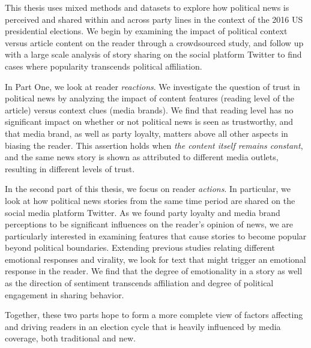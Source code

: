 \def\abstractpage{\cleardoublepage
\begin{center}{\large{\bf \@title} \\
by \\
\@author \\[\baselineskip]}
\par
\def\baselinestretch{1}\@normalsize
Submitted to the \@department, \\
\@school \\
on \@thesisdate, in partial fulfillment of the \\
requirements for the \@degreeword\ of \\
\@degree
\end{center}
\par
\begin{abstract}}
This thesis uses mixed methods and datasets to explore how political news is perceived and shared within and across party lines in the context of the 2016 US presidential elections. We begin by examining the impact of political context versus article content on the reader through a crowdsourced study, and follow up with a large scale analysis of story sharing on the social platform Twitter to find cases where popularity transcends political affiliation.
 
In Part One, we look at reader \emph{reactions}. We investigate the question of trust in political news by analyzing the impact of content features (reading level of the article) versus context clues (media brands). We find that reading level has no significant impact on whether or not political news is seen as trustworthy, and that media brand, as well as party loyalty, matters above all other aspects in biasing the reader. This assertion holds when \emph{the content itself remains constant}, and the same news story is shown as attributed to different media outlets, resulting in different levels of trust. 

In the second part of this thesis, we focus on reader \emph{actions}.  In particular, we look at how political news stories from the same time period are shared on the social media platform Twitter. As we found party loyalty and media brand perceptions to be significant influences on the reader's opinion of news, we are particularly interested in examining features that cause stories to become popular beyond political boundaries. Extending previous studies relating different emotional responses and virality, we look for text that might trigger an emotional response in the reader. We find that the degree of emotionality in a story as well as the direction of sentiment transcends affiliation and degree of political engagement in sharing behavior. 

Together, these two parts hope to form a more complete view of factors affecting and driving readers in an election cycle that is heavily influenced by media coverage, both traditional and new.





\afterpage{\blankpage}

 